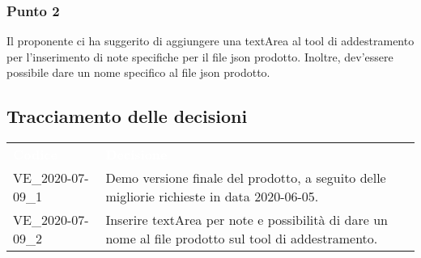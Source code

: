\subsubsection{Punto 2}
Il proponente ci ha suggerito di aggiungere una textArea al tool di addestramento per l'inserimento di note specifiche per il file json prodotto. Inoltre, dev'essere possibile dare un nome specifico al file json prodotto. 

\pagebreak
\subsection{Tracciamento delle decisioni}
\centering
\begin{longtable}{ C{4cm}  C{12cm} }
\textcolor{white}{\textbf{Codice}} & \textcolor{white}{\textbf{Decisione}}\\	
		VE\_2020-07-09\_1 & Demo versione finale del prodotto, a seguito delle migliorie richieste in data 2020-06-05.\\
		VE\_2020-07-09\_2 & Inserire textArea per note e possibilità di dare un nome al file prodotto sul tool di addestramento.\\



\end{longtable}




